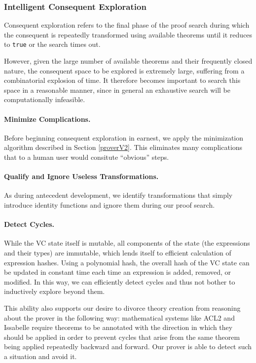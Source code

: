 		\subsubsection{Intelligent Consequent Exploration}

Consequent exploration refers to the final phase of the proof search during which the consequent is repeatedly transformed using available theorems until it reduces to \texttt{true} or the search times out.

However, given the large number of available theorems and their frequently closed nature, the consequent space to be explored is extremely large, suffering from a combinatorial explosion of time.  It therefore becomes important to search this space in a reasonable manner, since in general an exhaustive search will be computationally infeasible.

\paragraph{Minimize Complications.}  Before beginning consequent exploration in earnest, we apply the minimization algorithm described in Section \ref{proverV2}.  This eliminates many complications that to a human user would consitute ``obvious'' steps.

\paragraph{Qualify and Ignore Useless Transformations.}  As during antecedent development, we identify transformations that simply introduce identity functions and ignore them during our proof search.

\paragraph{Detect Cycles.}  While the VC state itself is mutable, all components of the state (the expressions and their types) are immutable, which lends itself to efficient calculation of expression hashes.  Using a polynomial hash, the overall hash of the VC state can be updated in constant time each time an expression is added, removed, or modified.  In this way, we can efficiently detect cycles and thus not bother to inductively explore beyond them.

This ability also supports our desire to divorce theory creation from reasoning about the prover in the following way: mathematical systems like ACL2\cite{ACL2} and Issabelle\cite{Issabelle} require theorems to be annotated with the direction in which they should be applied in order to prevent cycles that arise from the same theorem being applied repeatedly backward and forward.  Our prover is able to detect such a situation and avoid it.

